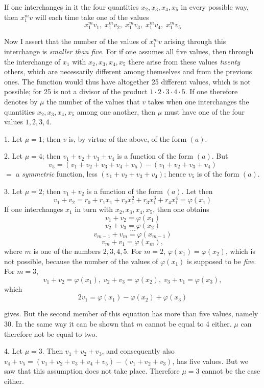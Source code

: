 \documentclass{article}
\begin{document}
If one interchanges in it the four quantities $x_2, x_3, x_4, x_5$ in every possible way, then $x_1^{m} v$ will each time take one of the values
\[ x_1^{m} v_1, \; x_1^{m} v_2, \; x_1^{m} v_3, \; x_1^{m} v_4, \; x_1^{m} v_5 \]

Now I assert that the number of the values of $x_1^{m} v$ arising through this interchange is \emph{smaller than five}. For if one assumes all five values, then through the interchange of $x_1$ with $x_2, x_3, x_4, x_5$ there arise from these values \emph{twenty} others, which are necessarily different among themselves and from the previous ones. The function would thus have altogether 25 different values, which is not possible; for 25 is not a divisor of the product $1 \cdot 2 \cdot 3 \cdot 4 \cdot 5$. If one therefore denotes by $\mu$ the number of the values that $v$ takes when one interchanges the quantities $x_2, x_3, x_4, x_5$ among one another, then $\mu$ must have one of the four values $1, 2, 3, 4$.

1. Let $\mu = 1$; then $v$ is, by virtue of the above, of the form $(a)$.

2. Let $\mu = 4$; then $v_1 + v_2 + v_3 + v_4$ is a function of the form $(a)$. But
\[ v_5 = (v_1 + v_2 + v_3 + v_4 + v_5) - (v_1 + v_2 + v_3 + v_4) \]
$=$ a \emph{symmetric} function, less $(v_1 + v_2 + v_3 + v_4)$; hence $v_5$ is of the form $(a)$.

3. Let $\mu = 2$; then $v_1 + v_2$ is a function of the form $(a)$. Let then
\[ v_1 + v_2 = r_0 + r_1 x_1 + r_2 x_1^{2} + r_3 x_1^{3} + r_4 x_1^{4} = \varphi(x_1) \]
If one interchanges $x_1$ in turn with $x_2, x_3, x_4, x_5$, then one obtains
\[ v_1 + v_2 = \varphi(x_1) \]
\[ v_2 + v_3 = \varphi(x_2) \]
\[ \ldots \]
\[ v_{m-1} + v_m = \varphi(x_{m-1}) \]
\[ v_m + v_1 = \varphi(x_m), \]
where $m$ is one of the numbers $2, 3, 4, 5$. For $m = 2$, $\varphi(x_1) = \varphi(x_2)$, which is not possible, because the number of the values of $\varphi(x_1)$ is supposed to be \emph{five}. For $m = 3$,
\[ v_1 + v_2 = \varphi(x_1), \; v_2 + v_3 = \varphi(x_2), \; v_3 + v_1 = \varphi(x_3), \]
which
\[ 2 v_1 = \varphi(x_1) - \varphi(x_2) + \varphi(x_3) \]

gives. But the second member of this equation has more than five values, namely 30. In the same way it can be shown that $m$ cannot be equal to 4 either. $\mu$ can therefore not be equal to two.

4. Let $\mu = 3$. Then $v_1 + v_2 + v_3$, and consequently also $v_4 + v_5 = (v_1 + v_2 + v_3 + v_4 + v_5) - (v_1 + v_2 + v_3)$, has five values. But we saw that this assumption does not take place. Therefore $\mu = 3$ cannot be the case either.
\end{document}
